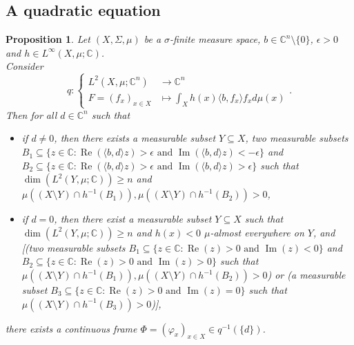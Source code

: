\documentclass[a4paper,12pt]{article}
\theoremstyle{plain}
\newtheorem{proposition}{Proposition}[section]
\theoremstyle{definition}
\theoremstyle{remark}
\begin{document}
\subsection{A quadratic equation}

\begin{proposition}
\label{Propq^(-1)(d)ContainsFrame}
Let $(X,\Sigma,\mu)$ be a $\sigma$-finite measure space, $b \in \mathbb{C}^n \setminus \{0\}$, $\epsilon > 0$ and $h \in L^\infty(X,\mu;\mathbb{C})$. \\
Consider 
\[ q : \begin{cases} L^2(X,\mu;\mathbb{C}^n) &\to \mathbb{C}^n \\ F = (f_x)_{x \in X} &\mapsto \int_X h(x) \langle b , f_x \rangle f_x d\mu(x) \end{cases}. \]
Then for all $d \in \mathbb{C}^n$ such that 
\begin{itemize} 
\item if $d \neq 0$, then there exists a measurable subset $Y \subseteq X$, two measurable subsets $B_1 \subseteq \{z \in \mathbb{C} : \operatorname{Re}(\langle b , d \rangle z) > \epsilon \text{ and } \operatorname{Im}(\langle b , d \rangle z) < - \epsilon \}$ and $B_2 \subseteq \{z \in \mathbb{C} : \operatorname{Re}(\langle b , d \rangle z) > \epsilon \text{ and } \operatorname{Im}(\langle b , d \rangle z) > \epsilon\}$ such that $\dim(L^2(Y,\mu;\mathbb{C})) \geq n$ and $\mu((X \setminus Y) \cap h^{-1}(B_1)),\mu((X \setminus Y) \cap h^{-1}(B_2))>0$,
\item if $d = 0$, then there exist a measurable subset $Y \subseteq X$ such that $\dim(L^2(Y,\mu;\mathbb{C})) \geq n$ and $h(x) < 0$ $\mu$-almost everywhere on $Y$, and [(two measurable subsets $B_1 \subseteq \{z \in \mathbb{C} : \operatorname{Re}(z) > 0 \text{ and } \operatorname{Im}(z) < 0 \}$ and $B_2 \subseteq \{z \in \mathbb{C} : \operatorname{Re}(z) > 0 \text{ and } \operatorname{Im}(z) > 0\}$ such that $\mu((X \setminus Y) \cap h^{-1}(B_1)),\mu((X \setminus Y) \cap h^{-1}(B_2))>0$) or (a measurable subset $B_3 \subseteq \{z \in \mathbb{C} : \operatorname{Re}(z) > 0 \text{ and } \operatorname{Im}(z) = 0\}$ such that $\mu((X \setminus Y) \cap h^{-1}(B_3))>0$)],
\end{itemize}
there exists a continuous frame $\Phi = (\varphi_x)_{x \in X} \in q^{-1}(\{d\})$.
\end{proposition}
\end{document}
